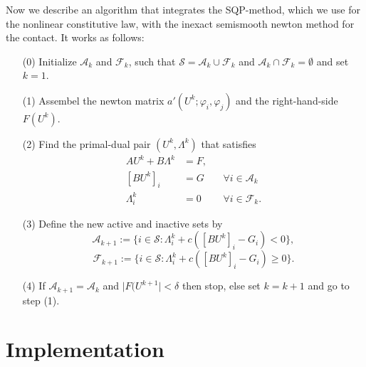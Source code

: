 \documentclass{article}
\begin{document}
Now we describe an algorithm that integrates the SQP-method, which we use for the nonlinear constitutive law, with the
inexact semismooth newton method for the contact. It works as follows:
\begin{itemize}
 \item[(0)] Initialize $\mathcal{A}_k$ and $\mathcal{F}_k$, such that $\mathcal{S} = \mathcal{A}_k \cup \mathcal{F}_k$ and $\mathcal{A}_k \cap \mathcal{F}_k = \emptyset$ and set $k = 1$.
 \item[(1)] Assembel the newton matrix $a'(U^k;\varphi_i,\varphi_j)$ and the right-hand-side $F(U^k)$.
 \item[(2)] Find the primal-dual pair $(U^k,\Lambda^k)$ that satisfies
 \begin{align*}
 AU^k + B\Lambda^k & = F, &\\
 \left[BU^k\right]_i & = G & & \forall i\in\mathcal{A}_k\\
 \Lambda^k_i & = 0 & & \forall i\in\mathcal{F}_k.
 \end{align*}
 \item[(3)] Define the new active and inactive sets by
 $$\mathcal{A}_{k+1}:=\lbrace i\in\mathcal{S}:\Lambda^k_i + c\left(\left[BU^k\right]_i - G_i\right) < 0\rbrace,$$
 $$\mathcal{F}_{k+1}:=\lbrace i\in\mathcal{S}:\Lambda^k_i + c\left(\left[BU^k\right]_i - G_i\right) \geq 0\rbrace.$$
 \item[(4)] If $\mathcal{A}_{k+1} = \mathcal{A}_k$ and $\vert F(U^{k+1}\vert < \delta$ then stop, else set $k=k+1$ and go to step (1).
\end{itemize}

\section{Implementation}
\end{document}
